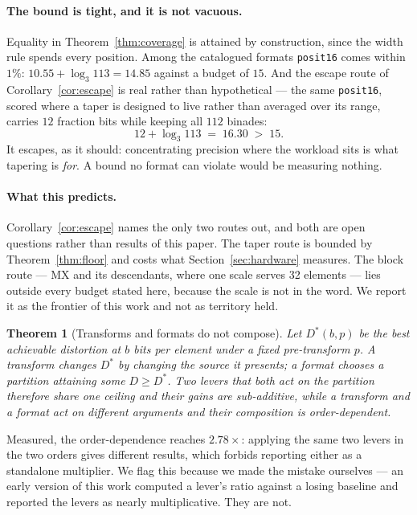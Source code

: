 \documentclass[11pt]{article}
\newtheorem{theorem}{Theorem}
\theoremstyle{definition}
\begin{document}
\paragraph{The bound is tight, and it is not vacuous.} Equality in
Theorem~\ref{thm:coverage} is attained by construction, since the width rule
spends every position. Among the catalogued formats \texttt{posit16} comes within
$1\%$: $10.55 + \log_3 113 = 14.85$ against a budget of $15$. And the escape route
of Corollary~\ref{cor:escape} is real rather than hypothetical --- the same
\texttt{posit16}, scored where a taper is designed to live rather than averaged
over its range, carries $12$ fraction bits while keeping all $112$ binades:
\[
  12 + \log_3 113 \;=\; 16.30 \;>\; 15 .
\]
It escapes, as it should: concentrating precision where the workload sits is what
tapering is \emph{for}. A bound no format can violate would be measuring nothing.

\paragraph{What this predicts.} Corollary~\ref{cor:escape} names the only two
routes out, and both are open questions rather than results of this paper. The
taper route is bounded by Theorem~\ref{thm:floor} and costs what
Section~\ref{sec:hardware} measures. The block route --- MX and its descendants,
where one scale serves 32 elements --- lies outside every budget stated here,
because the scale is not in the word. We report it as the frontier of this work
and not as territory held.




\begin{theorem}[Transforms and formats do not compose]
\label{thm:compose}
Let $D^{*}(b,p)$ be the best achievable distortion at $b$ bits per element under
a fixed pre-transform $p$. A transform changes $D^{*}$ by changing the source it
presents; a format chooses a partition attaining some $D \ge D^{*}$. Two levers
that both act on the partition therefore share one ceiling and their gains are
sub-additive, while a transform and a format act on different arguments and their
composition is order-dependent.
\end{theorem}

Measured, the order-dependence reaches $2.78\times$: applying the same two levers
in the two orders gives different results, which forbids reporting either as a
standalone multiplier. We flag this because we made the mistake ourselves ---
an early version of this work computed a lever's ratio against a losing baseline
and reported the levers as nearly multiplicative. They are not.
\end{document}
